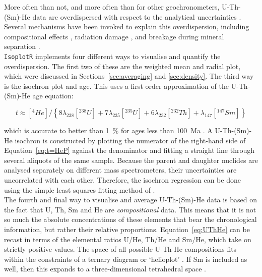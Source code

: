 \documentclass{article}
\begin{document}
More often than not, and more often than for other geochronometers,
U-Th-(Sm)-He data are overdispersed with respect to the analytical
uncertainties \citep{fitzgerald2006}. Several mechanisms have been
invoked to explain this overdispersion, including compositional
effects \citep{djimbi2015}, radiation damage \citep{flowers2009,
  guenthner2013}, and breakage during mineral separation
\citep{brown2013}.\\

\texttt{IsoplotR} implements four different ways to visualise and
quantify the overdispersion.  The first two of these are the weighted
mean and radial plot, which were discussed in
Sections~\ref{sec:averaging} and \ref{sec:density}. The third way is
the isochron plot and age. This uses a first order approximation of
the U-Th-(Sm)-He age equation:

\begin{equation}
  t \approx \left[{}^{4}He\right]/\left\{
    8\lambda_{238}[{}^{238}U] + 7\lambda_{235}[{}^{235}U] +
    6\lambda_{232} [{}^{232}Th] + \lambda_{147} [{}^{147}Sm]
    \right\}
  \label{eq:t=HeP}
\end{equation}

\noindent which is accurate to better than \SI{1}{\percent} for ages
less than 100~Ma \citep{vermeesch2008a}. A U-Th-(Sm)-He isochron is
constructed by plotting the numerator of the right-hand side of
Equation~\ref{eq:t=HeP} against the denominator and fitting a straight
line through several aliquots of the same sample. Because the parent
and daughter nuclides are analysed separately on different mass
spectrometers, their uncertainties are uncorrelated with each
other. Therefore, the isochron regression can be done using the simple
least squares fitting method of \citet{york1966}.\\

The fourth and final way to visualise and average U-Th-(Sm)-He data is
based on the fact that U, Th, Sm and He are \emph{compositional}
data. This means that it is not so much the absolute concentrations of
these elements that bear the chronological information, but rather
their relative proportions. Equation~\ref{eq:UThHe} can be recast in
terms of the elemental ratios U/He, Th/He and Sm/He, which take on
strictly positive values.  The space of all possible U-Th-He
compositions fits within the constraints of a ternary diagram or
`helioplot' \citep{vermeesch2010a}. If Sm is included as well, then
this expands to a three-dimensional tetrahedral space
\citep{vermeesch2008a}.\\
\end{document}
